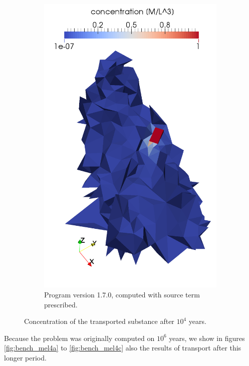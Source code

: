 \begin{figure}[!h]
\begin{subfigure}[b]{0.3\textwidth}
        \includegraphics[width=\textwidth]{tests_graphics/mel_transport_end_170.pdf}
        \caption{Program version 1.7.0, computed with source term prescribed.}
        \label{fig:bench_mel3c}
    \end{subfigure}
    \caption{Concentration of the transported substance after $10^4$ years.}
    \label{fig:bench_mel3}
\end{figure}

Because the problem was originally computed on $10^6$ years, we show in figures \ref{fig:bench_mel4a} to \ref{fig:bench_mel4c} 
also the results of transport after this longer period.

